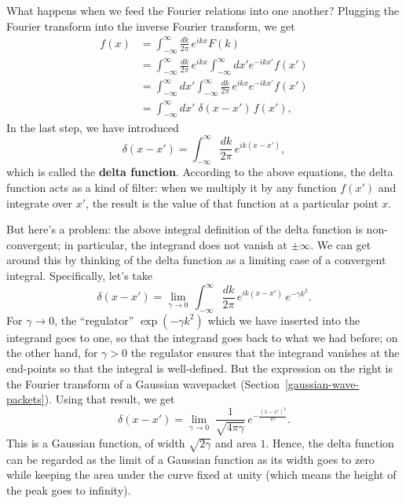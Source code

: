 \documentclass[10pt,a4paper]{article}
\begin{document}
What happens when we feed the Fourier relations into one another?
Plugging the Fourier transform into the inverse Fourier transform, we
get
\begin{align}
  f(x) &= \int_{-\infty}^\infty \frac{dk}{2\pi} \, e^{ikx} F(k) \\
&= \int_{-\infty}^\infty \frac{dk}{2\pi} \, e^{ikx} \int_{-\infty}^\infty dx' e^{-ikx'} f(x')\\
&= \int_{-\infty}^\infty dx' \int_{-\infty}^\infty \frac{dk}{2\pi} \, e^{ikx}  e^{-ikx'} f(x')\\
  &= \int_{-\infty}^\infty  dx' \; \delta(x-x')\, f(x'),
\end{align}
In the last step, we have introduced
\begin{equation}
\delta(x-x') = \int_{-\infty}^\infty \frac{dk}{2\pi} \, e^{ik(x-x')},
\end{equation}
which is called the \textbf{delta function}. According to the above
equations, the delta function acts as a kind of filter: when we multiply
it by any function $f(x')$ and integrate over $x'$, the result is
the value of that function at a particular point $x$.

But here's a problem: the above integral definition of the delta
function is non-convergent; in particular, the integrand does not vanish
at $\pm \infty$. We can get around this by thinking of the delta
function as a limiting case of a convergent integral. Specifically,
let's take
\begin{equation}
\delta(x-x') = \lim_{\gamma \rightarrow 0} \, \int_{-\infty}^\infty \frac{dk}{2\pi} \, e^{ik(x-x')} \, e^{-\gamma k^2}.
\end{equation}
For $\gamma \rightarrow 0$, the ``regulator'' $\exp(-\gamma k^2)$
which we have inserted into the integrand goes to one, so that the
integrand goes back to what we had before; on the other hand, for
$\gamma > 0$ the regulator ensures that the integrand vanishes at the
end-points so that the integral is well-defined. But the expression on
the right is the Fourier transform of a Gaussian wavepacket
(Section~\ref{gaussian-wave-packets}). Using that result, we get
\begin{equation}
\delta(x-x') = \lim_{\gamma \rightarrow 0} \; \frac{1}{\sqrt{4\pi\gamma}} \, e^{-\frac{(x-x')^2}{4\gamma}}.
\end{equation}
This is a Gaussian function, of width $\sqrt{2\gamma}$ and area
$1$. Hence, the delta function can be regarded as the limit of a
Gaussian function as its width goes to zero while keeping the area
under the curve fixed at unity (which means the height of the peak
goes to infinity).
\end{document}
